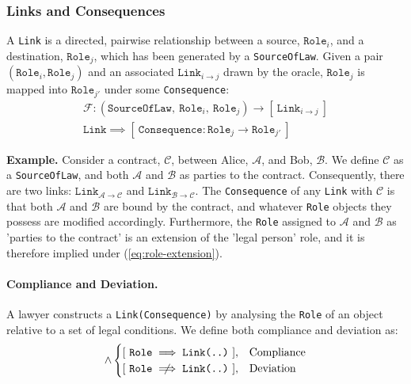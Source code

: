 \documentclass{article}
\numberwithin{equation}{section}
\newcommand{\quickexample}[1]{
\begin{tcolorbox}
	\textbf{Example.} #1
\end{tcolorbox}
}
\begin{document}



\subsubsection{Links and Consequences}\label{section:links-and-consequences}

A \texttt{Link} is a directed, pairwise relationship between a source, $\texttt{Role}_i$, and a destination, $\texttt{Role}_j$, which has been generated by a \texttt{SourceOfLaw}. Given a pair $(\texttt{Role}_i, \texttt{Role}_j)$ and an associated $\texttt{Link}_{i \rightarrow j}$ drawn by the oracle, $\texttt{Role}_j$ is mapped into $\texttt{Role}_{j'}$ under some \texttt{Consequence}:
\begin{align}\label{eq:role-extension}
	\mathcal{F} : (\texttt{SourceOfLaw}, \ \texttt{Role}_i, \ \texttt{Role}_j) \rightarrow [ \ \texttt{Link}_{i \rightarrow j} \ ] \\
	\texttt{Link} \implies [ \ \texttt{Consequence} : \texttt{Role}_j \rightarrow \texttt{Role}_{j'} \ ]
\end{align}

\vspace{0.25cm}
\quickexample{
	Consider a contract, $\mathcal{C}$, between Alice, $\mathcal{A}$, and Bob, $\mathcal{B}$. We define $\mathcal{C}$ as a \texttt{SourceOfLaw}, and both $\mathcal{A}$ and $\mathcal{B}$ as parties to the contract. Consequently, there are two links: $\texttt{Link}_{\mathcal{A} \rightarrow \mathcal{C}}$ and $\texttt{Link}_{\mathcal{B} \rightarrow \mathcal{C}}$. The \texttt{Consequence} of any \texttt{Link} with $\mathcal{C}$ is that both $\mathcal{A}$ and $\mathcal{B}$ are bound by the contract, and whatever \texttt{Role} objects they possess are modified accordingly. Furthermore, the \texttt{Role} assigned to $\mathcal{A}$ and $\mathcal{B}$ as 'parties to the contract' is an extension of the 'legal person' role, and it is therefore implied under (\ref{eq:role-extension}).
}



\paragraph{Compliance and Deviation.} A lawyer constructs a \texttt{Link(Consequence)} by analysing the \texttt{Role} of an object relative to a set of legal conditions. We define both compliance and deviation as:
\begin{equation}
[ \ \exists \ \texttt{Link(Existence, Consequence)} \ ] \land 
	\begin{cases}
		[ \ \texttt{Role} \implies \texttt{Link(..)} \ ], & \text{Compliance} \\
		[ \ \texttt{Role} \centernot\implies \texttt{Link(..)} \ ], & \text{Deviation}
	\end{cases}
\end{equation}
\end{document}
